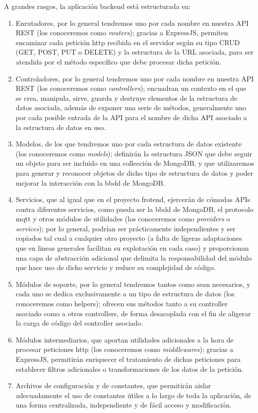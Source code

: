 A grandes rasgos, la aplicación backend está estructurada en:
\begin{enumerate}
 \item Enrutadores, por lo general tendremos uno por cada nombre en nuestra API REST (los conoceremos como \textit{routers}); gracias a ExpressJS, permiten encaminar cada petición http recibida en el servidor según su tipo CRUD (GET, POST, PUT o DELETE) y la estructura de la URL asociada, para ser atendida por el método específico que debe procesar dicha petición.
 \item Controladores, por lo general tendremos uno por cada nombre en nuestra API REST (los conoceremos como \textit{controllers}); encuadran un contexto en el que se crea, manipula, sirve, guarda y destruye elementos de la estructura de datos asociada, además de exponer una serie de métodos, generalmente uno por cada posible entrada de la API para el nombre de dicha API asociado a la estructura de datos en uso.
 \item Modelos, de los que tendremos uno por cada estructura de datos existente (los conoceremos como \textit{models}); definirán la estructura JSON que debe seguir un objeto para ser incluido en una collección de MongoDB, y que utilizaremos para generar y reconocer objetos de dicho tipo de estructura de datos y poder mejorar la interacción con la \gls{bbdd} de MongoDB.
 \item Servicios, que al igual que en el proyecto frotend, ejercerán de cómodas APIs contra diferentes servicios, como pueda ser la \gls{bbdd} de MongoDB, el protocolo \gls{mqtt} y otros módulos de utilidades (los conoceremos como \textit{providers} o \textit{services}); por lo general, podrían ser prácticamente independientes y ser copiados tal cual a cualquier otro proyecto (a falta de ligeras adaptaciones que en lineas generales facilitan su explotación en cada caso) y proporcionan una capa de abstracción adicional que delimita la responsabilidad del módulo que hace uso de dicho servicio y reduce su complejidad de código.
 \item Módulos de soporte, por lo general tendremos tantos como sean necesarios, y cada uno se dedica exclusivamente a un tipo de estructura de datos (los conoceremos como helpers); ofrecen sus métodos tanto a su controller asociado como a otros controllers, de forma desacoplada con el fin de aligerar la carga de código del controller asociado.
 \item Módulos intermediarios, que aportan utilidades adicionales a la hora de procesar peticiones http (los conoceremos como \textit{middlewares}); gracias a ExpressJS, permitirán enriquecer el tratamiento de dichas peticiones para establecer filtros adicionales o transformaciones de los datos de la petición.
 \item Archivos de configuración y de constantes, que permitirán aislar adecuadamente el uso de constantes útiles a lo largo de toda la aplicación, de una forma centralizada, independiente y de fácil acceso y modificación.
\end{enumerate}

